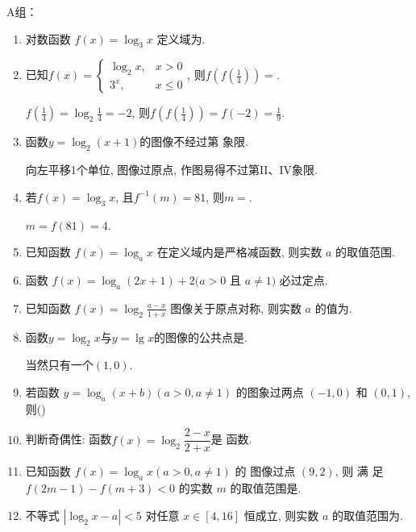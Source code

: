 A组：
\begin{enumerate}
\item 对数函数 $f(x)=\log _3 x$ 定义域为.


\item 已知$f(x)=\begin{cases}
\log_2x, & x>0\\
3^x, & x\leq 0
\end{cases}$, 则$f(f(\frac{1}{4}))=$. 
\begin{jieda}
$f(\frac{1}{4})=\log_2\frac{1}{4}=-2$, 则$f(f(\frac{1}{4}))=f(-2)=\frac{1}{9}$. 
\end{jieda}


\item 函数$y=\log_2(x+1)$的图像不经过第 象限. 
\begin{jieda}
向左平移1个单位, 图像过原点, 作图易得不过第II、IV象限. 
\end{jieda}

\item 若$f(x)=\log_3x$, 且$f^{-1}(m)=81$, 则$m=$. 
\begin{jieda}
$m=f(81)=4$. 
\end{jieda}

\item 已知函数 $f(x)=\log _a x$ 在定义域内是严格减函数, 则实数 $a$ 的取值范围.

\item 函数 $f(x)=\log _a(2 x+1)+2(a>0$ 且 $a \neq 1)$ 必过定点.

\item 已知函数 $f(x)=\log _2 \frac{a-x}{1+x}$ 图像关于原点对称, 则实数 $a$ 的值为.

\item 函数$y=\log_2x$与$y=\lg{x}$的图像的公共点是. 
\begin{jieda}
当然只有一个$(1,0)$. 
\end{jieda}


\item 若函数 $y=\log _a(x+b)(a>0, a \neq 1)$ 的图象过两点 $(-1,0)$ 和 $(0,1)$, 则\dotfill()

\item 判断奇偶性: 函数$f(x)=\log_2\dfrac{2-x}{2+x}$是 函数.

\item 已知函数 $f(x)=\log _a x(a>0, a \neq 1)$ 的 图像过点 $(9,2)$, 则 满 足 $f(2 m-1)-f(m+3)<0$ 的实数 $m$ 的取值范围是.

\item 不等式 $\left|\log _2 x-a\right|<5$ 对任意 $x \in[4,16]$ 恒成立, 则实数 $a$ 的取值范围为.

\end{enumerate}

